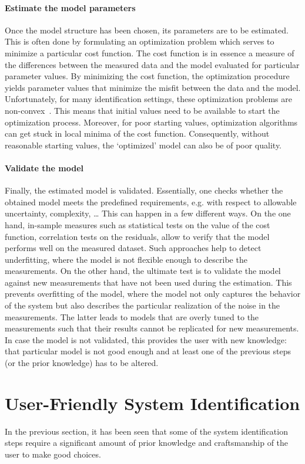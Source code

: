 \paragraph{Estimate the model parameters}
Once the model structure has been chosen, its parameters are to be estimated.
This is often done by formulating an optimization problem which serves to minimize a particular cost function.
The cost function is in essence a measure of the differences between the measured data and the model evaluated for particular parameter values.
By minimizing the cost function, the optimization procedure yields parameter values that minimize the misfit between the data and the model.
Unfortunately, for many identification settings, these optimization problems are non-convex~\citep{Boyd2004}.
This means that initial values need to be available to start the optimization process.
Moreover, for poor starting values, optimization algorithms can get stuck in local minima of the cost function.
Consequently, without reasonable starting values, the `optimized' model can also be of poor quality. 


\paragraph{Validate the model}
Finally, the estimated model is validated.
Essentially, one checks whether the obtained model meets the predefined requirements, e.g. with respect to allowable uncertainty, complexity, \ldots
This can happen in a few different ways.
On the one hand, in-sample measures such as statistical tests on the value of the cost function, correlation tests on the residuals,  allow to verify that the model performs well on the measured dataset.
Such approaches help to detect underfitting, where the model is not flexible enough to describe the measurements.
On the other hand, the ultimate test is to validate the model against new measurements that have not been used during the estimation.
This prevents overfitting of the model, where the model not only captures the behavior of the system but also describes the particular realization of the noise in the measurements.
The latter leads to models that are overly tuned to the measurements such that their results cannot be replicated for new measurements.
In case the model is not validated, this provides the user with new knowledge: that particular model is not good enough and at least one of the previous steps (or the prior knowledge) has to be altered.

\section{User-Friendly System Identification}
In the previous section, it has been seen that some of the system identification steps require a significant amount of prior knowledge and craftsmanship of the user to make good choices.

